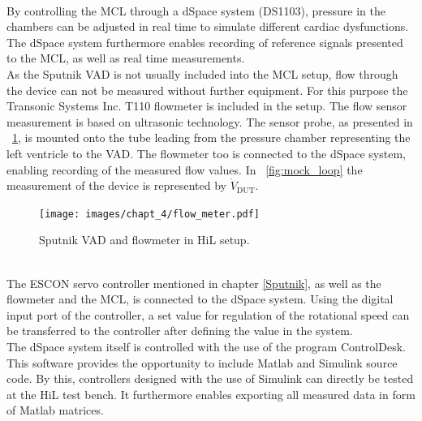 \\By controlling the MCL through a dSpace system (DS1103), pressure in the chambers can be adjusted in real time to simulate different cardiac dysfunctions. The dSpace system furthermore enables recording of reference signals presented to the MCL, as well as real time measurements.
\\As the Sputnik VAD is not usually included into the MCL setup, flow through the device can not be measured without further equipment. For this purpose the Transonic Systems Inc. T110 flowmeter is included in the setup. The flow sensor measurement is based on ultrasonic technology. The sensor probe, as presented in \figurename~\ref{fig:flow_meter_tube}, is mounted onto the tube leading from the pressure chamber representing the left ventricle to the VAD. The flowmeter too is connected to the dSpace system, enabling recording of the measured flow values. In \figurename~\ref{fig:mock_loop} the measurement of the device is represented by $\dot{V}_{\mathrm{DUT}}$.
\begin{figure}[ht]
  \centering
  \texttt{[image: images/chapt\_4/flow\_meter.pdf]}
  \caption[Sputnik VAD and flowmeter in HiL setup]{Sputnik VAD and flowmeter in HiL setup.}
  \label{fig:flow_meter_tube}
\end{figure}
\\The ESCON servo controller mentioned in chapter \ref{Sputnik}, as well as the flowmeter and the MCL, is connected to the dSpace system. Using the digital input port of the controller, a set value for regulation of the rotational speed can be transferred to the controller after defining the value in the system.
\\The dSpace system itself is controlled with the use of the program ControlDesk. This software provides the opportunity to include Matlab and Simulink source code. By this, controllers designed with the use of Simulink can directly be tested at the HiL test bench. It furthermore enables exporting all measured data in form of Matlab matrices.

